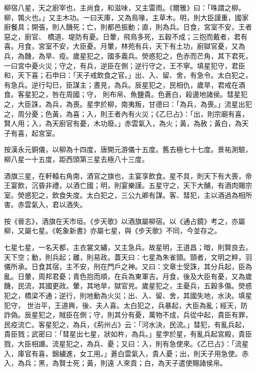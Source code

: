 \begin{pinyinscope}
 柳宿八星，天之廚宰也，主尚食，和滋味，又主雷雨。《爾雅》曰：「咮謂之柳。柳，鶉火也。」又主木功。一曰天庫，又為鳥喙，主草木。明，則大臣謹重，國家廚餐具；開張，則人饑死；亡，則都邑振動；直，則為兵。日食，宮室不安，王者惡之，廚官、
 橋道、堤防有憂。日暈，飛鳥多死，五穀不成；三抱而戴者，君有喜。月食，宮室不安，大臣憂。月暈，林苑有兵，天下有土功，廚獄官憂，又為兵，為饑，為旱、疫。歲星犯之，國多義兵。熒惑犯之，色赤而芒角，其下君死，一曰宮中憂火災；守之，有兵，逆臣在側；逆行守之，王不寧。填星犯守，君臣和，天下喜；石申曰：「天子戒飲食之官。」出、入、留、舍，有急令。太白犯之，有急兵。逆行勾巳，臣謀主；晝見，為兵。辰星犯之，民相仇，歲旱，君戒在酒食。客星犯之，咎在周國；守，
 則布帛、魚鹽貴。色蒼白，殺邊地諸侯。彗星犯之，大臣誅，為兵，為喪。星孛於柳，南夷叛，甘德曰：「為兵，為喪。」流星出犯之，周分憂；色黃，為喜；入，則王者內有火災；《乙巳占》：「出，則宗廟有喜，賢人用；入，為天廚官有憂，木功廢。」赤雲氣入，為火；黃，為赦；黃白，為天子有喜，起宮室。



 按漢永元銅儀，以柳為十四度，唐開元游儀十五度。舊去極七十七度。景祐測驗，柳八星一十五度，距西頭第三星去極八十三度。



 酒旗三星，在軒轅右角南，酒官之旗也，主宴享飲食。星不具，則天下有大喪，帝王宴飲，沉昏非禮，以酒亡國；明，則宴樂謹。五星守之，天下大酺，有酒肉賜宗室。熒惑犯之，飲食失度。太白犯之，三公九卿有謀。客、彗犯，主以酒過為相所害。赤雲氣入，君以酒失。



 按《晉志》，酒旗在天市垣。《步天歌》以酒旗屬柳宿。以《通占鏡》考之，亦屬柳，又屬七星。《乾象新書》亦屬七星，與《步天歌》不同，今並存之。



 七星七星，一名天都，主衣裳文繡，又主急兵。故星明，王道昌；暗，則賢良去，天下空；動，則兵起；離，則易政。蓋天曰：七星為朱雀頸。頸者，文明之粹，羽儀所承。日食其宿，主不安，刑在門戶之神。又曰：文章士受誅，其分兵起，臣為亂。日暈，周邦君憂；青色抱而順，在兵為東軍吉。月食，後及大臣有憂，又為歲饑，民流，其國更政。暈，其地旱，獄官兇。歲星犯之，主憂兵，五穀多傷。熒惑犯之，橋梁不通；逆行，則地動為火災；出、入、留、舍，其國失地，水決。填星犯守，
 世治平，王道興，後、夫人喜。太白犯之，兵暴起，大臣為亂；經天，防詐偽。辰星犯之，賊臣在側；守，則其分有憂，萬物不成，兵從中起，貴臣有罪，民疫流亡。客星犯之，為兵，《荊州占》云：「河水決，民流。」彗犯，有亂兵起，貴臣戮；武密曰：「彗星出七星，狀如杵，為兵。」星孛於星，有亂兵起宮殿，貴臣戮，大臣相譖。流星犯之，為兵、憂；又曰：入，則有急使來。《乙巳占》：「流星入，庫官有喜，錦繡進，女工用。」蒼白雲氣入，貴人憂；出，則天子用急使。赤入，為兵；黑，為賢士死；黃，則遠
 人來貢；白，為天子遣使賜諸侯帛。




\end{pinyinscope}
